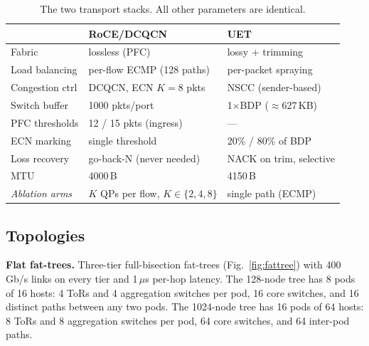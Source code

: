 \documentclass[conference]{IEEEtran}
\begin{document}
\begin{table}[t]
\centering
\caption{The two transport stacks. All other parameters are identical.}
\label{tab:stacks}
\footnotesize
\setlength{\tabcolsep}{4pt}
\begin{tabular}{@{}lll@{}}
\toprule
 & \textbf{RoCE/DCQCN} & \textbf{UET} \\
\midrule
Fabric          & lossless (PFC)            & lossy + trimming \\
Load balancing  & per-flow ECMP (128 paths) & per-packet spraying \\
Congestion ctrl & DCQCN, ECN $K{=}8$ pkts   & NSCC (sender-based) \\
Switch buffer   & 1000 pkts/port            & 1$\times$BDP ($\approx$627\,KB) \\
PFC thresholds  & 12 / 15 pkts (ingress)    & --- \\
ECN marking     & single threshold          & 20\% / 80\% of BDP \\
Loss recovery   & go-back-N (never needed)  & NACK on trim, selective \\
MTU             & 4000\,B                   & 4150\,B \\
\midrule
\emph{Ablation arms} & $K$ QPs per flow, $K{\in}\{2,4,8\}$ & single path (ECMP) \\
\bottomrule
\end{tabular}
\end{table}

\subsection{Topologies}
\label{sec:topo}

\textbf{Flat fat-trees.}
Three-tier full-bisection fat-trees (Fig.~\ref{fig:fattree}) with 400\,Gb/s
links on every tier and 1\,$\mu$s per-hop latency. The 128-node tree has 8 pods
of 16 hosts: 4 ToRs and 4 aggregation switches per pod, 16 core switches, and
16 distinct paths between any two pods. The 1024-node tree has 16 pods of 64
hosts: 8 ToRs and 8 aggregation switches per pod, 64 core switches, and 64
inter-pod paths.
\end{document}

